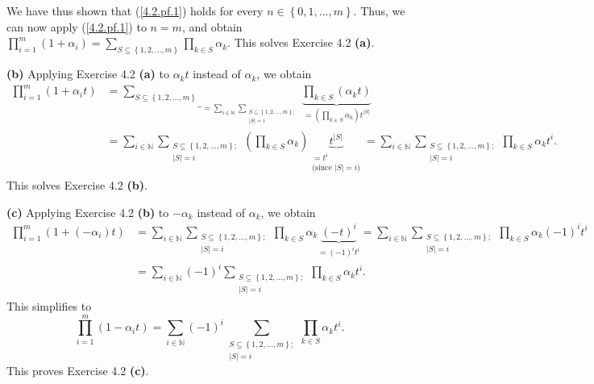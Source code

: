 \documentclass[numbers=enddot,12pt,final,onecolumn,notitlepage]{scrartcl}%
\begin{document}
We have thus shown that (\ref{4.2.pf.1}) holds for every $n\in\left\{
0,1,...,m\right\}  $. Thus, we can now apply (\ref{4.2.pf.1}) to $n=m$, and
obtain $\prod\limits_{i=1}^{m}\left(  1+\alpha_{i}\right)  =\sum
\limits_{S\subseteq\left\{  1,2,...,m\right\}  }\prod\limits_{k\in S}%
\alpha_{k}$. This solves Exercise 4.2 \textbf{(a)}.

\textbf{(b)} Applying Exercise 4.2 \textbf{(a)} to $\alpha_{k}t$ instead of
$\alpha_{k}$, we obtain%
\begin{align*}
\prod\limits_{i=1}^{m}\left(  1+\alpha_{i}t\right)   &  =\underbrace{\sum
\limits_{S\subseteq\left\{  1,2,...,m\right\}  }}_{=\sum\limits_{i\in
\mathbb{N}}\sum\limits_{\substack{S\subseteq\left\{  1,2,...,m\right\}
;\\\left\vert S\right\vert =i}}}\underbrace{\prod\limits_{k\in S}\left(
\alpha_{k}t\right)  }_{=\left(  \prod\limits_{k\in S}\alpha_{k}\right)
t^{\left\vert S\right\vert }}\\
&  =\sum\limits_{i\in\mathbb{N}}\sum\limits_{\substack{S\subseteq\left\{
1,2,...,m\right\}  ;\\\left\vert S\right\vert =i}}\left(  \prod\limits_{k\in
S}\alpha_{k}\right)  \underbrace{t^{\left\vert S\right\vert }}%
_{\substack{=t^{i}\\\text{(since }\left\vert S\right\vert =i\text{)}}%
}=\sum\limits_{i\in\mathbb{N}}\sum\limits_{\substack{S\subseteq\left\{
1,2,...,m\right\}  ;\\\left\vert S\right\vert =i}}\prod\limits_{k\in S}%
\alpha_{k}t^{i}.
\end{align*}
This solves Exercise 4.2 \textbf{(b)}.

\textbf{(c)} Applying Exercise 4.2 \textbf{(b)} to $-\alpha_{k}$ instead of
$\alpha_{k}$, we obtain%
\begin{align*}
\prod\limits_{i=1}^{m}\left(  1+\left(  -\alpha_{i}\right)  t\right)   &
=\sum\limits_{i\in\mathbb{N}}\sum\limits_{\substack{S\subseteq\left\{
1,2,...,m\right\}  ;\\\left\vert S\right\vert =i}}\prod\limits_{k\in S}%
\alpha_{k}\underbrace{\left(  -t\right)  ^{i}}_{=\left(  -1\right)  ^{i}t^{i}%
}=\sum\limits_{i\in\mathbb{N}}\sum\limits_{\substack{S\subseteq\left\{
1,2,...,m\right\}  ;\\\left\vert S\right\vert =i}}\prod\limits_{k\in S}%
\alpha_{k}\left(  -1\right)  ^{i}t^{i}\\
&  =\sum\limits_{i\in\mathbb{N}}\left(  -1\right)  ^{i}\sum
\limits_{\substack{S\subseteq\left\{  1,2,...,m\right\}  ;\\\left\vert
S\right\vert =i}}\prod\limits_{k\in S}\alpha_{k}t^{i}.
\end{align*}
This simplifies to%
\[
\prod\limits_{i=1}^{m}\left(  1-\alpha_{i}t\right)  =\sum\limits_{i\in
\mathbb{N}}\left(  -1\right)  ^{i}\sum\limits_{\substack{S\subseteq\left\{
1,2,...,m\right\}  ;\\\left\vert S\right\vert =i}}\prod\limits_{k\in S}%
\alpha_{k}t^{i}.
\]
This proves Exercise 4.2 \textbf{(c)}.
\end{document}
